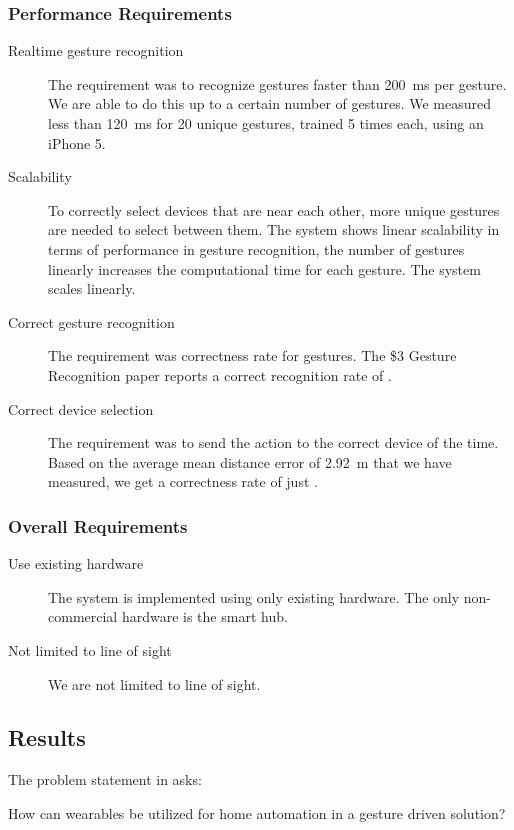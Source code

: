 \subsubsection{Performance Requirements}
\begin{description}
  \item[\yes Realtime gesture recognition] The requirement was to recognize gestures faster than \SI{200}{\milli\second} per gesture. We are able to do this up to a certain number of gestures. We measured less than \SI{120}{\milli\second} for \num{20} unique gestures, trained \num{5} times each, using an iPhone 5.
  \item[\yes Scalability] To correctly select devices that are near each other, more unique gestures are needed to select between them. The system shows linear scalability in terms of performance in gesture recognition, \ie the number of gestures linearly increases the computational time for each gesture. The system scales linearly.  
  \item[\yes Correct gesture recognition] The requirement was  correctness rate for gestures. The \$3 Gesture Recognition paper \cite{threedollar} reports a correct recognition rate of .
  \item[\no Correct device selection] The requirement was to send the action to the correct device  of the time. Based on the average mean distance error of \SI{2.92}{\meter} that we have measured, we get a correctness rate of just . 
\end{description}

\subsubsection{Overall Requirements}
\begin{description}
  \item[\yes Use existing hardware] The system is implemented using only existing hardware. The only non-commercial hardware is the smart hub. 
  \item[\yes Not limited to line of sight] We are not limited to line of sight. 
\end{description}

\subsection{Results}
The problem statement in  asks:
\begin{framed}
  How can wearables be utilized for home automation in a gesture driven solution?
\end{framed}

